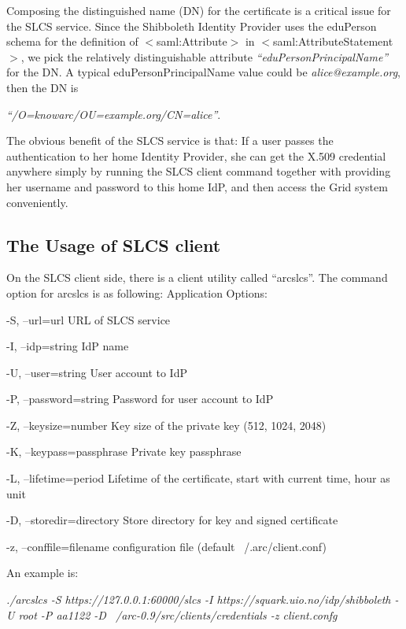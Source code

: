 \documentclass{article}                            %
\begin{document}
    Composing the distinguished name (DN) for the certificate is a critical issue for the SLCS service. Since the Shibboleth Identity Provider uses the eduPerson schema for the definition of $<$saml:Attribute$>$ in $<$saml:AttributeStatement$>$, we pick the relatively distinguishable attribute \textit{``eduPersonPrincipalName''} for the DN. A typical eduPersonPrincipalName value could be \textit{alice@example.org}, then the DN is

\textit{``/O=knowarc/OU=example.org/CN=alice''}.

    The obvious benefit of the SLCS service is that: If a user passes the authentication to her home Identity Provider, she can get the X.509 credential anywhere simply by running the SLCS client command together with providing her username and password to this home IdP, and then access the Grid system conveniently.

\subsection{The Usage of SLCS client} %
\label{subsec:slcs_client}

    On the SLCS client side, there is a client utility called ``arcslcs''.  The command option for arcslcs is as following:
Application Options:

  -S, --url=url                URL of SLCS service

  -I, --idp=string             IdP name

  -U, --user=string            User account to IdP

  -P, --password=string        Password for user account to IdP

  -Z, --keysize=number         Key size of the private key (512, 1024, 2048)

  -K, --keypass=passphrase     Private key passphrase

  -L, --lifetime=period        Lifetime of the certificate, start with current time, hour as unit

  -D, --storedir=directory     Store directory for key and signed certificate

  -z, --conffile=filename      configuration file (default ~/.arc/client.conf)

An example is:

\textit{./arcslcs -S https://127.0.0.1:60000/slcs -I https://squark.uio.no/idp/shibboleth -U root -P aa1122 -D   ~/arc-0.9/src/clients/credentials -z client.confg}
\end{document}
